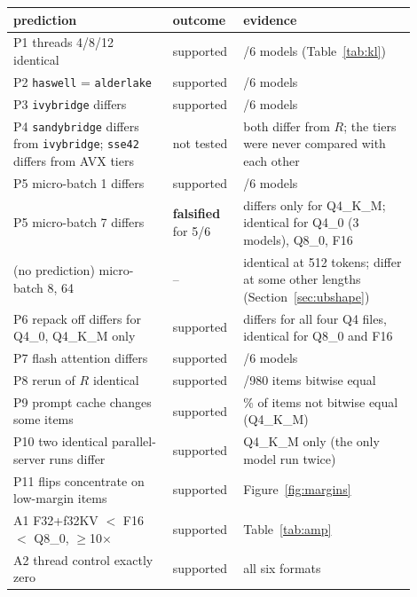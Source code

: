 \begin{tabular}{>{\raggedright\arraybackslash}p{0.37\linewidth}>{\raggedright\arraybackslash}p{0.13\linewidth}>{\raggedright\arraybackslash}p{0.40\linewidth}}
\toprule
prediction & outcome & evidence\\
\midrule
P1 threads 4/8/12 identical & supported & 6/6 models (Table~\ref{tab:kl})\\
P2 \texttt{haswell} = \texttt{alderlake} & supported & 6/6 models\\
P3 \texttt{ivybridge} differs & supported & 6/6 models\\
P4 \texttt{sandybridge} differs from \texttt{ivybridge}; \texttt{sse42} differs from AVX tiers & not tested & both differ from $R$; the tiers were never compared with each other\\
P5 micro-batch 1 differs & supported & 6/6 models\\
P5 micro-batch 7 differs & \textbf{falsified} for 5/6 & differs only for Q4\_K\_M; identical for Q4\_0 (3 models), Q8\_0, F16\\
(no prediction) micro-batch 8, 64 & -- & identical at 512 tokens; differ at some other lengths (Section~\ref{sec:ubshape})\\
P6 repack off differs for Q4\_0, Q4\_K\_M only & supported & differs for all four Q4 files, identical for Q8\_0 and F16\\
P7 flash attention differs & supported & 6/6 models\\
P8 rerun of $R$ identical & supported & 980/980 items bitwise equal\\
P9 prompt cache changes some items & supported & 68\% of items not bitwise equal (Q4\_K\_M)\\
P10 two identical parallel-server runs differ & supported & Q4\_K\_M only (the only model run twice)\\
P11 flips concentrate on low-margin items & supported & Figure~\ref{fig:margins}\\
A1 F32+f32KV $<$ F16 $<$ Q8\_0, $\ge$10$\times$ & supported & Table~\ref{tab:amp}\\
A2 thread control exactly zero & supported & all six formats\\
\bottomrule
\end{tabular}
